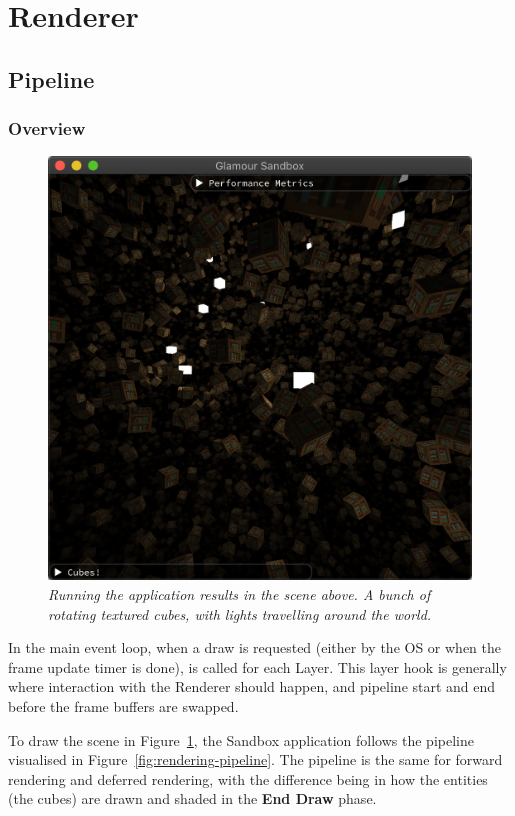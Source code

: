 \section{Renderer}\label{sec:renderer}

\subsection{Pipeline}

\subsubsection{Overview}

\begin{figure}
  \begin{center}
    \includegraphics[width=0.6\columnwidth]{../sandbox.png}
  \end{center}
  \caption[Sandbox screenshot]{
    \emph{
      Running the application results in the scene above.
      A bunch of rotating textured cubes, with lights travelling around the world.
    }
  }\label{fig:sandbox-screenshot}
\end{figure}

In the main event loop, when a draw is requested (either by the OS or when the frame update timer is done),  is called for each Layer.
This layer hook is generally where interaction with the Renderer should happen, and pipeline start and end before the frame buffers are swapped.

To draw the scene in Figure~\ref{fig:sandbox-screenshot}, the Sandbox application follows the pipeline visualised in Figure~\ref{fig:rendering-pipeline}.
The pipeline is the same for forward rendering and deferred rendering, with the difference being in how the entities (the cubes) are drawn and shaded in the \textbf{End Draw} phase.

